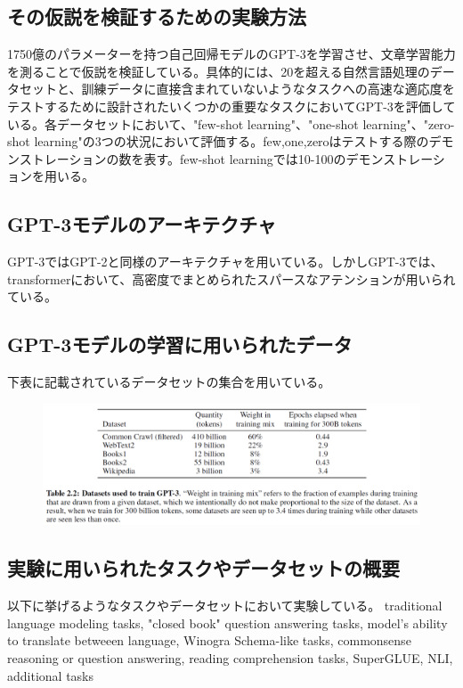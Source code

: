 \documentclass[a4j,11pt]{jarticle}
\begin{document}
\subsection*{その仮説を検証するための実験方法}
1750億のパラメーターを持つ自己回帰モデルのGPT-3を学習させ、文章学習能力を測ることで仮説を検証している。具体的には、20を超える自然言語処理のデータセットと、訓練データに直接含まれていないようなタスクへの高速な適応度をテストするために設計されたいくつかの重要なタスクにおいてGPT-3を評価している。各データセットにおいて、"few-shot learning"、"one-shot learning"、"zero-shot learning"の3つの状況において評価する。few,one,zeroはテストする際のデモンストレーションの数を表す。few-shot learningでは10-100のデモンストレーションを用いる。

\subsection*{GPT-3モデルのアーキテクチャ}
GPT-3ではGPT-2\cite{GPT-2}と同様のアーキテクチャを用いている。しかしGPT-3では、transformerにおいて、高密度でまとめられたスパースなアテンションが用いられている。

\subsection*{GPT-3モデルの学習に用いられたデータ}
下表\cite{GPT-3}に記載されているデータセットの集合を用いている。
\begin{figure}[hbtp]
    \centering
    \includegraphics[width=15cm]{p5-1.png}
\end{figure}

\subsection*{実験に用いられたタスクやデータセットの概要}
以下に挙げるようなタスクやデータセットにおいて実験している。
traditional language modeling tasks, "closed book" question answering tasks, model's ability to translate betweeen language, Winogra Schema-like tasks, commonsense reasoning or question answering, reading comprehension tasks, SuperGLUE, NLI, additional tasks
\end{document}
